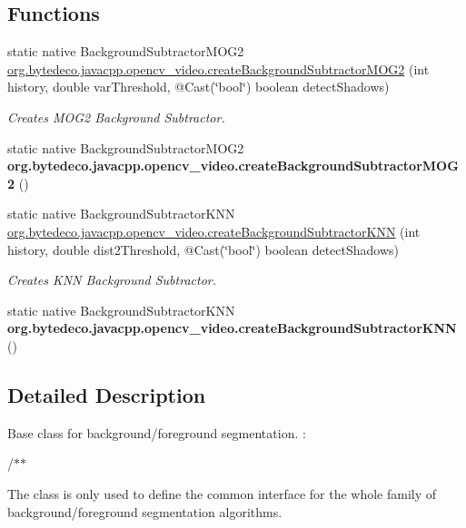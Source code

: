 \subsection*{Functions}
\begin{DoxyCompactItemize}
\item 
static native Background\+Subtractor\+M\+O\+G2 \hyperlink{group__video__motion_ga0820edc51bf6a34fb6ec60e0bfa47770}{org.\+bytedeco.\+javacpp.\+opencv\+\_\+video.\+create\+Background\+Subtractor\+M\+O\+G2} (int history, double var\+Threshold, @Cast(\char`\"{}bool\char`\"{}) boolean detect\+Shadows)
\begin{DoxyCompactList}\small\item\em Creates M\+O\+G2 Background Subtractor. \end{DoxyCompactList}\item 
\mbox{\label{group__video__motion_ga3a794e8bb9a9b6b8a80034a89e0f9f91}} 
static native Background\+Subtractor\+M\+O\+G2 {\bfseries org.\+bytedeco.\+javacpp.\+opencv\+\_\+video.\+create\+Background\+Subtractor\+M\+O\+G2} ()
\item 
static native Background\+Subtractor\+K\+NN \hyperlink{group__video__motion_ga1376788db4935dd8798d7e087e7697c9}{org.\+bytedeco.\+javacpp.\+opencv\+\_\+video.\+create\+Background\+Subtractor\+K\+NN} (int history, double dist2\+Threshold, @Cast(\char`\"{}bool\char`\"{}) boolean detect\+Shadows)
\begin{DoxyCompactList}\small\item\em Creates K\+NN Background Subtractor. \end{DoxyCompactList}\item 
\mbox{\label{group__video__motion_ga93bb58271300dd9a4746f8a89fdd0eae}} 
static native Background\+Subtractor\+K\+NN {\bfseries org.\+bytedeco.\+javacpp.\+opencv\+\_\+video.\+create\+Background\+Subtractor\+K\+NN} ()
\end{DoxyCompactItemize}


\subsection{Detailed Description}
Base class for background/foreground segmentation. \+: 

/$\ast$$\ast$

The class is only used to define the common interface for the whole family of background/foreground segmentation algorithms. 


